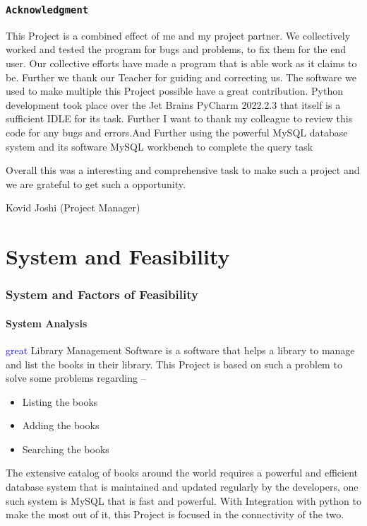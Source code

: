 \documentclass[12pt, a4paper, titlepage, openany]{report}
\begin{document}
\newpage

\section*{ \centering \texttt{Acknowledgment}}
This Project is a combined effect of me and my project partner. We collectively worked and tested the program for bugs and problems, to fix them for the end user. Our collective efforts have made a program that is able work as it claims to be. Further we thank our Teacher for guiding and correcting us. The software we used to make multiple this Project possible have a great contribution. Python development took place over the Jet Brains PyCharm 2022.2.3 that itself is a sufficient IDLE for its task. Further I want to thank my colleague to review this code for any bugs and errors.And Further using the powerful MySQL database system and its software MySQL workbench to complete the query task

Overall this was a interesting and comprehensive task to make such a project and we are grateful to get such a opportunity.

{\flushright Kovid Joshi (Project Manager)} 

\newpage
\tableofcontents

\newpage
\part{System and Feasibility}
\section{System and Factors of Feasibility}
\subsection{System Analysis}
\textcolor{blue}{great}
Library Management Software is a software that helps a library to manage and list the books in their library. This Project is based on such a problem to solve some problems regarding --
\begin{itemize}
\item Listing the books 
\item Adding the books
\item Searching the books
\end{itemize}
The extensive catalog of books around the world requires a powerful and efficient database system that is maintained and updated regularly by the developers, one such system is MySQL that is fast and powerful. With Integration with python to make the most out of it, this Project is focused in the connectivity of the two.
\end{document}
